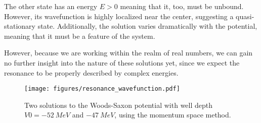 The other state has an energy $E>0$ meaning that it, too, must be unbound. However, its wavefunction is highly localized near the center, suggesting a quasi-stationary state. Additionally, the solution varies dramatically with the potential, meaning that it must be a feature of the system. 

However, because we are working within the realm of real numbers, we can gain no further insight into the nature of these solutions yet, since we expect the resonance to be properly described by complex energies. 


\begin{figure}
  \centering
  \texttt{[image: figures/resonance\_wavefunction.pdf]}
  \caption{Two solutions to the Woods-Saxon potential with well depth $V0=\SI{-52}{MeV}$ and $\SI{-47}{MeV}$, using the momentum space method.}
  \label{fig:resonance wavefunction}
\end{figure}
